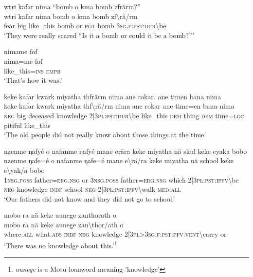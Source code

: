 \ea\label{ex:11:a2587}
wtri kafar nima ``bomb o kma bomb zfrärm?''\\
\gll wtri	kafar	nima	bomb	o	kma	bomb	zf{\textbackslash}rä/rm\\
     fear	big	like\_this	bomb	or	\textsc{pot}	bomb	3\textsc{sg}.\textsc{f}:\textsc{pst}:\textsc{dur}{\textbackslash}be\\
\glt `They were really scared ``Is it a bomb or could it be a bomb?'''
\z

\ea\label{ex:11:a2588}
nimame fof\\
\gll nima=me	fof\\
     like\_this=\textsc{ins}	\textsc{emph}\\
\glt `That's how it was.'
\z

\ea\label{ex:11:a2589}
keke kafar kwark miyatha thfrärm nima ane rokar. ane timen bana nima\\
\gll keke	kafar	kwark	miyatha	thf{\textbackslash}rä/rm	nima	ane	rokar	ane	time=en	bana	nima\\
     \textsc{neg}	big	deceased	knowledge	2|3\textsc{pl}:\textsc{pst}:\textsc{dur}{\textbackslash}be	like\_this	\textsc{dem}	thing	\textsc{dem}	time=\textsc{loc}	pitiful	like\_this\\
\glt `The old people did not really know about those things at the time.'
\z

\newpage
\ea\label{ex:11:a2591}
nzenme ŋafyé o nafanme ŋafyé mane erära keke miyatha nä skul keke eyaka bobo\\
\gll nzenme	ŋafe=é	o	nafanme	ŋafe=é	mane	e{\textbackslash}rä/ra	keke	miyatha	nä	school	keke	e{\textbackslash}yak/a	bobo\\
     1\textsc{nsg}.\textsc{poss}	father=\textsc{erg}.\textsc{nsg}	or	3\textsc{nsg}.\textsc{poss}	father=\textsc{erg}.\textsc{nsg}	which	2|3\textsc{pl}:\textsc{pst}:\textsc{ipfv}{\textbackslash}be	\textsc{neg}	knowledge	\textsc{indf}	school	\textsc{neg}	2|3\textsc{pl}:\textsc{pst}:\textsc{ipfv}{\textbackslash}walk	\textsc{med}:\textsc{all}\\
\glt `Our fathers did not know and they did not go to school.'
\z

\ea\label{ex:11:a2592}
mobo ra nä keke aunege zanthorath o\\
\gll mobo	ra	nä	keke	aunege	zan{\textbackslash}thor/ath	o\\
     where.\textsc{all}	what.\textsc{abs}	\textsc{indf}	\textsc{neg}	knowledge	2|3\textsc{pl}>3\textsc{sg}.\textsc{f}:\textsc{pst}:\textsc{pfv}:\textsc{vent}{\textbackslash}carry	or\\
\glt `There was no knowledge about this.'\footnote{\textit{aunege} is a Motu loanword meaning 'knowledge'}
\z

